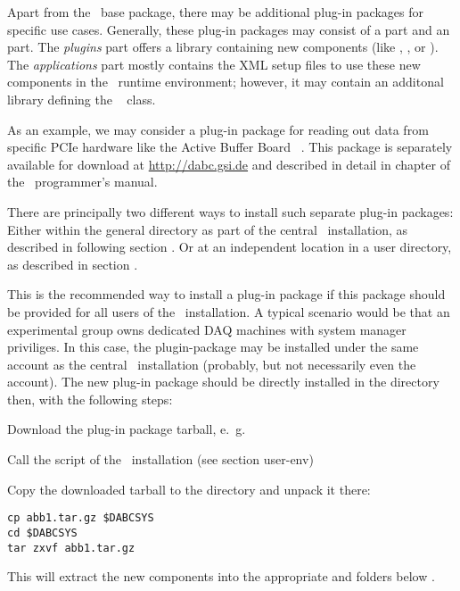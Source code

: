 Apart from the \dabc\ base package, there may be additional plug-in packages for
specific use cases. Generally, these plug-in packages may consist of a
 part and an  part.
The {\em plugins} part offers a library
containing new components (like , 
, or ). The {\em applications} part
mostly contains the XML setup files to use these new components in the
\dabc\ runtime environment; however, it 
may contain an additonal library defining the \dabc\ 
class.

As an example, we may consider a plug-in package for reading out data
from specific PCIe hardware like the Active Buffer Board \ABB\ \cite{AbbDescription}.
This package is separately available for download at \hyperref{http://dabc.gsi.de}{}{}{http://dabc.gsi.de}
and described in detail in chapter  of the \dabc\ programmer's manual.

There are principally two different ways to install such separate plug-in packages:
Either within the general  directory as part of the central \dabc\ installation, as
described in following section . Or at an independent location
in a user directory, as described in section .


This is the recommended way to install a plug-in package if this package should be provided
for all users of the \dabc\ installation. A typical scenario would be that an
experimental group owns dedicated DAQ machines with system manager priviliges.
In this case, the plugin-package may be installed under the same account as the
central \dabc\ installation (probably, but not necessarily even the  account).
The new plug-in package should be directly installed in the  directory
then, with the following steps:

\bnum
\item Download the plug-in package tarball, e.~g.\ 

\item Call the  script of the \dabc\ installation (see section user-env)

\item Copy the downloaded tarball to the  directory and unpack it there:
\begin{verbatim}
cp abb1.tar.gz $DABCSYS
cd $DABCSYS
tar zxvf abb1.tar.gz
\end{verbatim} 
This will extract the new components into the appropriate  and
 folders below .

